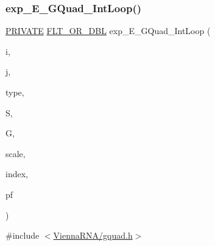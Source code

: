 \subsubsection{\texorpdfstring{exp\+\_\+\+E\+\_\+\+G\+Quad\+\_\+\+Int\+Loop()}{exp\_E\_GQuad\_IntLoop()}}
{\footnotesize\ttfamily \mbox{\hyperlink{group__utils_ga5e151c615eda34903514212f05a5ccf8}{P\+R\+I\+V\+A\+TE}} \mbox{\hyperlink{group__data__structures_ga31125aeace516926bf7f251f759b6126}{F\+L\+T\+\_\+\+O\+R\+\_\+\+D\+BL}} exp\+\_\+\+E\+\_\+\+G\+Quad\+\_\+\+Int\+Loop (\begin{DoxyParamCaption}\item[{int}]{i,  }\item[{int}]{j,  }\item[{int}]{type,  }\item[{short $\ast$}]{S,  }\item[{\mbox{\hyperlink{group__data__structures_ga31125aeace516926bf7f251f759b6126}{F\+L\+T\+\_\+\+O\+R\+\_\+\+D\+BL}} $\ast$}]{G,  }\item[{\mbox{\hyperlink{group__data__structures_ga31125aeace516926bf7f251f759b6126}{F\+L\+T\+\_\+\+O\+R\+\_\+\+D\+BL}} $\ast$}]{scale,  }\item[{int $\ast$}]{index,  }\item[{\mbox{\hyperlink{group__energy__parameters_ga01d8b92fe734df8d79a6169482c7d8d8}{vrna\+\_\+exp\+\_\+param\+\_\+t}} $\ast$}]{pf }\end{DoxyParamCaption})}



{\ttfamily \#include $<$\mbox{\hyperlink{gquad_8h}{Vienna\+R\+N\+A/gquad.\+h}}$>$}

